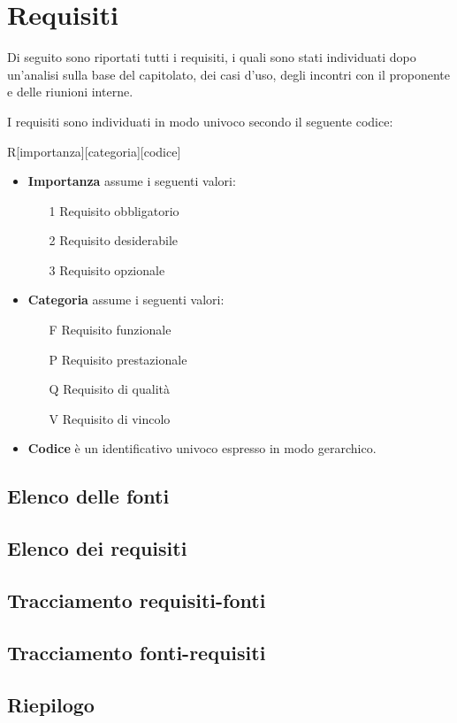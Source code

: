 \section{Requisiti}

Di seguito sono riportati tutti i requisiti, i quali sono stati individuati dopo un'analisi sulla base del capitolato, dei casi d'uso, degli incontri con il proponente e delle riunioni interne.


I requisiti sono individuati in modo univoco secondo il seguente codice:
\begin{center}
	R[importanza][categoria][codice]
\end{center}
\begin{itemize}

	\item \textbf{Importanza} assume i seguenti valori:
		\begin{itemize}
			\item[1] Requisito obbligatorio
			\item[2] Requisito desiderabile
			\item[3] Requisito opzionale
		\end{itemize}

	\item \textbf{Categoria} assume i seguenti valori:
		\begin{itemize}
			\item[F] Requisito funzionale
			\item[P] Requisito prestazionale
			\item[Q] Requisito di qualità
			\item[V] Requisito di vincolo
		\end{itemize}
	\item \textbf{Codice} è un identificativo univoco espresso in modo gerarchico.
\end{itemize}

\subsection{Elenco delle fonti}


\subsection{Elenco dei requisiti}


\subsection{Tracciamento requisiti-fonti}


\subsection{Tracciamento fonti-requisiti}


\subsection{Riepilogo}
